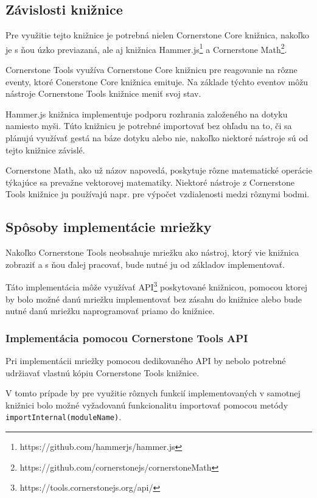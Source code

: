 \subsection {Závislosti knižnice}
Pre využitie tejto knižnice je potrebná nielen Cornerstone Core knižnica, nakoľko je s ňou úzko previazaná, ale aj knižnica Hammer.js\footnote{https://github.com/hammerjs/hammer.js} a Cornerstone Math\footnote{https://github.com/cornerstonejs/cornerstoneMath}.

Cornerstone Tools využíva Cornerstone Core knižnicu pre reagovanie na rôzne eventy, ktoré Conerstone Core knižnica emituje. Na základe týchto eventov môžu nástroje Cornerstone Tools knižnice meniť svoj stav.

Hammer.js knižnica implementuje podporu rozhrania založeného na dotyku namiesto myši. Túto knižnicu je potrebné importovať bez ohľadu na to, či sa plánujú využívať gestá na báze dotyku alebo nie, nakoľko niektoré nástroje sú od tejto knižnice závislé.

Cornerstone Math, ako už názov napovedá, poskytuje rôzne matematické operácie týkajúce sa prevažne vektorovej matematiky. Niektoré nástroje z Cornerstone Tools knižnice ju používajú napr. pre výpočet vzdialenosti medzi rôznymi bodmi.

\subsection {Spôsoby implementácie mriežky}
Nakoľko Cornerstone Tools neobsahuje mriežku ako nástroj, ktorý vie knižnica zobraziť a s ňou ďalej pracovať, bude nutné ju od základov implementovať.

Táto implementácia môže využívať API\footnote{https://tools.cornerstonejs.org/api/} poskytované knižnicou, pomocou ktorej by bolo možné danú mriežku implementovať bez zásahu do knižnice alebo bude nutné danú mriežku naprogramovať priamo do knižnice.

\subsubsection {Implementácia pomocou Cornerstone Tools API}
Pri implementácii mriežky pomocou dedikovaného API by nebolo potrebné udržiavať vlastnú kópiu Cornerstone Tools knižnice.

V tomto prípade by pre využitie rôznych funkcií implementovaných v samotnej knižnici bolo možné vyžadovanú funkcionalitu importovať pomocou metódy \texttt{importInternal(moduleName)}.

